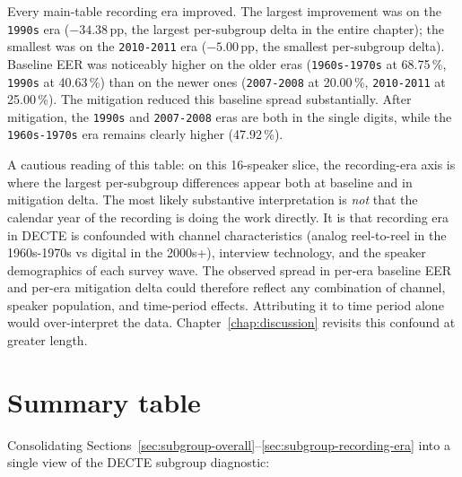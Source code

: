 Every main-table recording era improved. The largest improvement
was on the \texttt{1990s} era ($-34.38$\,pp, the largest per-subgroup delta
in the entire chapter); the smallest was on the \texttt{2010-2011} era
($-5.00$\,pp, the smallest per-subgroup delta). Baseline EER was
noticeably higher on the older eras (\texttt{1960s-1970s} at 68.75\,\%,
\texttt{1990s} at 40.63\,\%) than on the newer ones (\texttt{2007-2008} at 20.00\,\%,
\texttt{2010-2011} at 25.00\,\%). The mitigation reduced this baseline
spread substantially. After mitigation, the \texttt{1990s} and
\texttt{2007-2008} eras are both in the single digits, while the
\texttt{1960s-1970s} era remains clearly higher (47.92\,\%).

A cautious reading of this table: on this 16-speaker slice, the
recording-era axis is where the largest per-subgroup differences
appear both at baseline and in mitigation delta. The most likely
substantive interpretation is \emph{not} that the calendar year of the
recording is doing the work directly. It is that recording era
in DECTE is confounded with channel characteristics (analog
reel-to-reel in the 1960s-1970s vs digital in the 2000s+),
interview technology, and the speaker demographics of each survey
wave. The observed spread in per-era baseline EER and per-era
mitigation delta could therefore reflect any combination of
channel, speaker population, and time-period effects. Attributing
it to time period alone would over-interpret the data.
Chapter~\ref{chap:discussion} revisits this confound at greater length.


\section{Summary table}
\label{sec:subgroup-summary}

Consolidating Sections~\ref{sec:subgroup-overall}--\ref{sec:subgroup-recording-era} into a single view of the DECTE
subgroup diagnostic:

